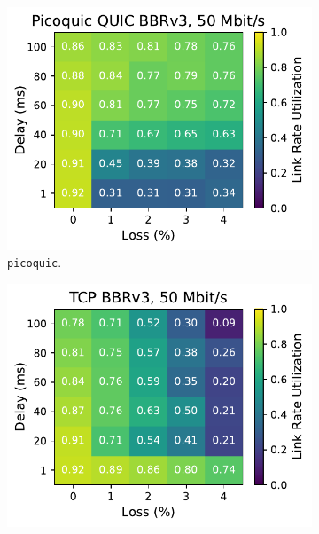 \begin{figure}[ht]
\begin{subfigure}[b]{0.22\linewidth}
        \includegraphics[width=\linewidth,trim={0 0 2cm 0},clip]{splitting-paper/figures/heatmaps/heatmap_picoquic_bbr3_50mbps.pdf}
        \caption{\texttt{picoquic}.}
    \end{subfigure}
    \begin{subfigure}[b]{0.89cm}
        \includegraphics[width=\linewidth,trim={8cm 0 0 0},clip]{splitting-paper/figures/heatmaps/heatmap_tcp_bbr3_50mbps.pdf}

\end{subfigure}
\end{figure}
